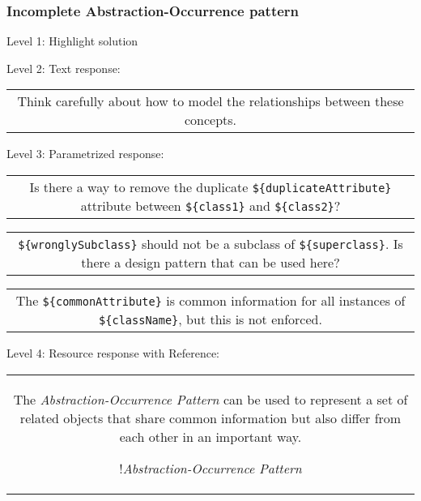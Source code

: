 \subsubsection{Incomplete Abstraction-Occurrence pattern}

\noindent Level 1: Highlight solution \medskip

\noindent Level 2: Text response: \medskip

\begin{tabular}{|c}
Think carefully about how to model the relationships between these concepts.
\end{tabular} \medskip

\noindent Level 3: Parametrized response: \medskip

\begin{tabular}{|c}
Is there a way to remove the duplicate \verb|${duplicateAttribute}| attribute between \verb|${class1}| and \verb|${class2}|?
\end{tabular} \medskip

\begin{tabular}{|c}
\verb|${wronglySubclass}| should not be a subclass of \verb|${superclass}|. Is there a design pattern that can be used here?
\end{tabular} \medskip

\begin{tabular}{|c}
The \verb|${commonAttribute}| is common information for all instances of \verb|${className}|, but this is not enforced.
\end{tabular} \medskip

\noindent Level 4: Resource response with Reference:

\begin{tabular}{|c}
The \textit{Abstraction-Occurrence Pattern} can be used to 
represent a set of related objects that share common information but also differ
from each other in an important way.

!\textit{Abstraction-Occurrence Pattern}
\end{tabular} \medskip



